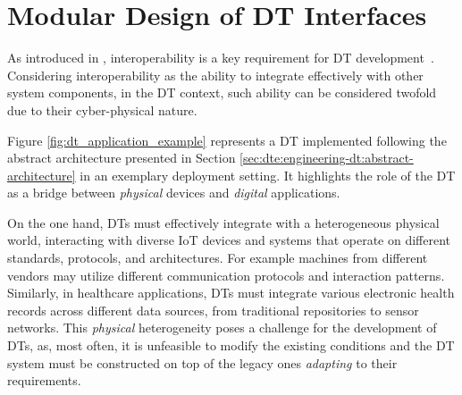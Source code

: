 




\section{Modular Design of \acl{DT} Interfaces}

As introduced in , interoperability is a key requirement for \ac{DT} development~\cite{Acharya_Khan_Päivärinta_2024,Klar_Arvidsson_Angelakis_2024}.
%
Considering interoperability as the ability to integrate effectively with other system components,
in the \ac{DT} context, such ability can be considered twofold due to their cyber-physical nature.

Figure \ref{fig:dt_application_example} represents a \ac{DT} implemented following the abstract architecture presented in Section \ref{sec:dte:engineering-dt:abstract-architecture} in an exemplary deployment setting.
%
It highlights the role of the \ac{DT} as a bridge between \emph{physical} devices and \emph{digital} applications.

On the one hand, \acp{DT} must effectively integrate with a heterogeneous physical world, interacting with diverse \ac{IoT} devices and systems that operate on different standards, protocols, and architectures.
%
For example machines from different vendors may utilize different communication protocols and interaction patterns.
%
Similarly, in healthcare applications, \acp{DT} must integrate various electronic health records across different data sources, from traditional repositories to sensor networks.
%
This \emph{physical} heterogeneity poses a challenge for the development of \acp{DT}, as, most often, it is unfeasible to modify the existing conditions and the \ac{DT} system must be constructed on top of the legacy ones \emph{adapting} to their requirements.

